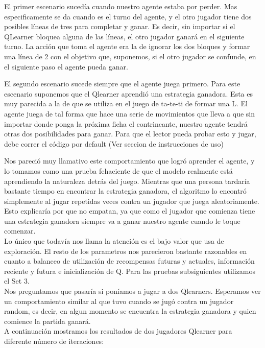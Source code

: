 El primer escenario sucedía cuando nuestro agente estaba por perder. Mas especificamente se da cuando es el turno del agente, y el otro jugador tiene dos posibles líneas de tres para completar y ganar.
Es decir, sin importar si el QLearner bloquea alguna de las líneas, el otro jugador ganará en el siguiente turno. La acción que toma el agente era la de ignorar los dos bloques y formar una línea de 2 con el objetivo que, suponemos, si el otro jugador se confunde, en el siguiente paso el agente pueda ganar.

El segundo escenario sucede siempre que el agente juega primero. Para este escenario suponemos que el Qlearner aprendió una estrategia ganadora. Esta es muy parecida a la de que se utiliza en el juego de ta-te-ti de formar una L. El agente juega de tal forma que hace una serie de movimientos que lleva a que sin importar donde ponga la próxima ficha el contrincante, nuestro agente tendrá otras dos posibilidades para ganar.
Para que el lector pueda probar esto y jugar, debe correr el código por default (Ver seccion de instrucciones de uso)

Nos pareció muy llamativo este comportamiento que logró aprender el agente, y lo tomamos como una prueba fehaciente de que el modelo realmente está aprendiendo la naturaleza detrás del juego. Mientras que una persona tardaría bastante tiempo en encontrar la estrategia ganadora, el algoritmo lo encontró simplemente al jugar repetidas veces contra un jugador que juega aleatoriamente.
Esto explicaría por que no empatan, ya que como el jugador que comienza tiene una estrategia ganadora siempre va a ganar nuestro agente cuando le toque comenzar.\\

Lo único que todavía nos llama la atención es el bajo valor que usa de exploración. El resto de los parametros nos parecieron bastante razonables en cuanto a balanceo de utilización de recompensas futuras y actuales, información reciente y futura e inicialización de Q.
Para las pruebas subsiguientes utilizamos el Set 3.\\

Nos preguntamos que pasaría si poníamos a jugar a dos Qlearners. Esperamos ver un comportamiento similar al que tuvo cuando se jugó contra un jugador random, es decir, en algun momento se encuentra la estrategia ganadora y quien comience la partida ganará.\\

A continuación mostramos los resultados de dos jugadores Qlearner para diferente número de iteraciones:

